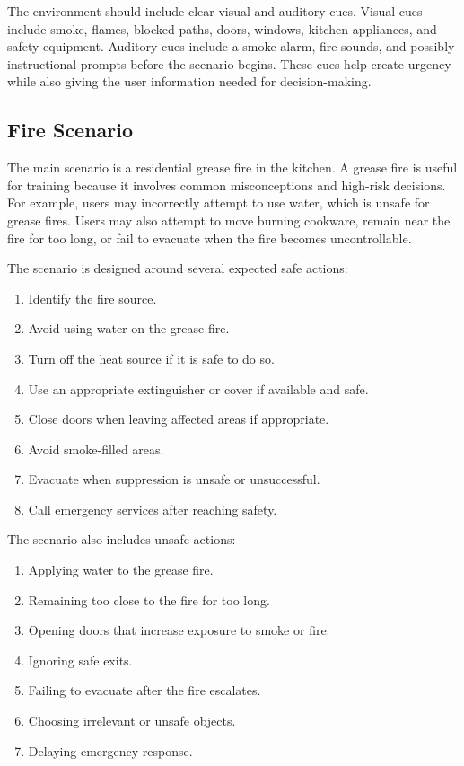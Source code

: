 \documentclass[manuscript, review]{acmart}
\begin{document}
{The environment should include clear visual and auditory cues. Visual cues include smoke, flames, blocked paths, doors, windows, kitchen appliances, and safety equipment. Auditory cues include a smoke alarm, fire sounds, and possibly instructional prompts before the scenario begins. These cues help create urgency while also giving the user information needed for decision-making.

\subsection{Fire Scenario}

The main scenario is a residential grease fire in the kitchen. A grease fire is useful for training because it involves common misconceptions and high-risk decisions. For example, users may incorrectly attempt to use water, which is unsafe for grease fires. Users may also attempt to move burning cookware, remain near the fire for too long, or fail to evacuate when the fire becomes uncontrollable.

The scenario is designed around several expected safe actions:

\begin{enumerate}
  \item Identify the fire source.
  \item Avoid using water on the grease fire.
  \item Turn off the heat source if it is safe to do so.
  \item Use an appropriate extinguisher or cover if available and safe.
  \item Close doors when leaving affected areas if appropriate.
  \item Avoid smoke-filled areas.
  \item Evacuate when suppression is unsafe or unsuccessful.
  \item Call emergency services after reaching safety.
\end{enumerate}

The scenario also includes unsafe actions:

\begin{enumerate}
  \item Applying water to the grease fire.
  \item Remaining too close to the fire for too long.
  \item Opening doors that increase exposure to smoke or fire.
  \item Ignoring safe exits.
  \item Failing to evacuate after the fire escalates.
  \item Choosing irrelevant or unsafe objects.
  \item Delaying emergency response.
\end{enumerate}

}
\end{document}

